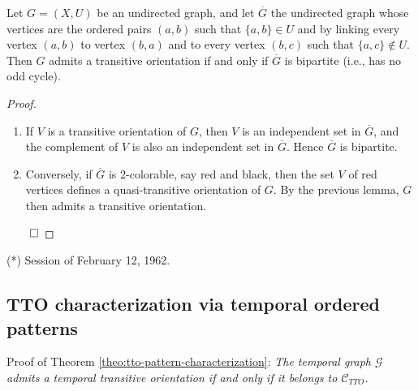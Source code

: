 \documentclass[runningheads]{llncs}
\begin{document}
\begin{theorem}
Let $G = (X,U)$ be an undirected graph, and let $\overline{G}$ the undirected graph whose vertices are the ordered pairs $(a,b)$ such that $\{a,b\} \in U$ and by linking every vertex $(a,b)$ to vertex $(b,a)$ and to every vertex $(b,c)$ such that $\{a,c\} \notin U$. Then $G$ admits a transitive orientation if and only if $\overline{G}$ is bipartite (i.e., has no odd cycle).
\end{theorem}

\begin{proof}
\begin{enumerate}
\item If $V$ is a transitive orientation of $G$, then $V$ is an independent set in $\overline{G}$, and the complement of $V$ is also an independent set in $\overline{G}$. Hence $\overline{G}$ is bipartite.

\item Conversely, if $\overline{G}$ is 2-colorable, say red and black, then the set $V$ of red vertices defines a quasi-transitive orientation of $G$. By the previous lemma, $G$ then admits a transitive orientation.
\end{enumerate}
$\qed$\end{proof}

\noindent (*) Session of February 12, 1962.


\subsection{TTO characterization via temporal ordered patterns}
\label{appendix:tto-pattern-characterization}

Proof of Theorem \ref{theo:tto-pattern-characterization}: \textit{The temporal graph $\mathcal{G}$ admits a temporal transitive orientation if and only if it
belongs to $\mathcal{C}_{TTO}$.}
\end{document}

